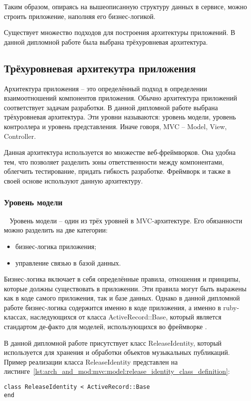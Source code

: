 Таким образом, опираясь на вышеописанную структуру данных в сервисе, можно строить приложение, наполняя его бизнес-логикой.

Существует множество подходов для построения архитектуры приложений. В данной дипломной работе была выбрана трёхуровневая архитектура.

\subsection{Трёхуровневая архитекутра приложения}
\label{sub:arch_and_mod:mvc}

Архитектура приложения -- это определённый подход в определении взаимоотношений компонентов приложения. Обычно архитектура приложений соответствует задачам разработки. В данной дипломной работе выбрана трёхуровневая архитектура. Эти уровни называются: уровень модели, уровень контроллера и уровень представления. Иначе говоря, MVC -- Model, View, Controller.

Данная архитектура используется во множестве веб-фреймворков. Она удобна тем, что позволяет разделить зоны ответственности между компонентами, облегчить тестирование, придать гибкость разработке. Фреймворк \ror{} и \ajs{} также в своей основе используют данную архитектуру.

\subsubsection{Уровень модели}
\label{sub:arch_and_mod:mvc:model}
~\newline
\indent Уровень модели -- один из трёх уровней в MVC-архитектуре. Его обязанности можно разделить на две категории:

\begin{itemize}
  \item бизнес-логика приложения;
  \item управление связью в базой данных.
\end{itemize}

Бизнес-логика включает в себя определённые правила, отношения и принципы, которые должны существовать в приложении. Эти правила могут быть выражены как в коде самого приложения, так и базе данных. Однако в данной дипломной работе бизнес-логика содержится именно в коде приложения, а именно в ruby-классах, наследующихся от класса ActiveRecord::Base, который является стандартом де-факто для моделей, использующихся во фреймворке \ror{}.

В данной дипломной работе присутствует класс ReleaseIdentity, который используется для хранения и обработки объектов музыкальных публикаций. Пример реализации класса ReleaseIdentity представлен на листинге~\ref{lst:arch_and_mod:mvc:model:release_identity_class_definition}:
\begin{lstlisting}[style=fsharpstyle,caption={Базовая реализация класса ReleaseIdentity}, label=lst:arch_and_mod:mvc:model:release_identity_class_definition]
class ReleaseIdentity < ActiveRecord::Base
end
\end{lstlisting}

